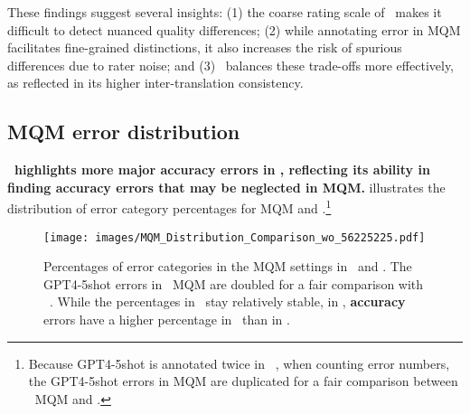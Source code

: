 

These findings suggest several insights: (1) the coarse rating scale of \sxsqr~makes it difficult to detect nuanced quality differences; (2) while annotating error in MQM facilitates fine-grained distinctions, it also increases the risk of spurious differences due to rater noise; and (3) \sxsmqm~balances these trade-offs more effectively, as reflected in its higher inter-translation consistency.

\subsection{MQM error distribution}\label{sec:error_distr}

\textbf{\sxsmqm~highlights more major accuracy errors in \ZhEn, reflecting its ability in finding accuracy errors that may be neglected in MQM.}  illustrates the distribution of error category percentages for MQM and \sxsmqm.\footnote{Because GPT4-5shot is annotated twice in \EnDe~\sxsmqm, when counting error numbers, the GPT4-5shot errors in MQM are duplicated for a fair comparison between \EnDe~MQM and \sxsmqm.} 

% 

\begin{figure*}[ht]
    \centering
    \texttt{[image: images/MQM\_Distribution\_Comparison\_wo\_56225225.pdf]}
    \caption{Percentages of error categories in the MQM settings in \ZhEn~and \EnDe. The GPT4-5shot errors in \EnDe~MQM are doubled for a fair comparison with \EnDe~\sxsmqm. While the percentages in \EnDe~stay relatively stable, in \ZhEn, {\color{gglblue} \textbf{accuracy}} errors have a higher percentage in \sxsmqm~than in \psxsmqm.}
    \label{fig:error_perc}
    \vspace{-7pt}
\end{figure*}

